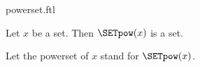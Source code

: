 \documentclass{stex}
\begin{document}
\begin{smodule}{powerset.ftl}

\begin{axiom}[forthel,title=Powerset Axiom,id=FOUNDATIONS_10_5862230203564032]
  Let $x$ be a set.
  Then $\SETpow(x)$ is a set.

  Let the powerset of $x$ stand for $\SETpow(x)$.
\end{axiom}
\end{smodule}
\end{document}
